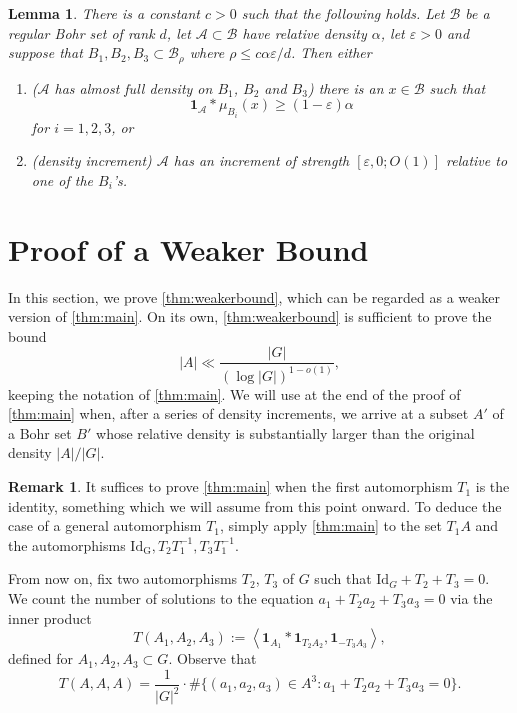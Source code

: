 \documentclass{daj}
\newtheorem{lemma}[theorem]{Lemma}
\theoremstyle{definition}
\newtheorem{remark}[theorem]{Remark}
\newcommand{\eps}{\varepsilon}
\newcommand{\m}[1]{\mu_{#1}}
\newcommand{\ind}[1]{\mathbf{1}_{#1}}
\newcommand{\inner}[2]{\left\langle#1, #2\right\rangle}
\newcommand{\A}{\ensuremath{\mathcal{A}}}
\newcommand{\B}{\ensuremath{\mathcal{B}}}
\begin{document}
\begin{lemma}
\label{lem:bourgain}
There is a constant $c>0$ such that the following holds. Let $\B$ be a regular Bohr set of rank $d$, let $\A\subset \B$ have relative density $\alpha$, let $\eps>0$ and suppose that ${B_1, B_2, B_3} \subset \B_\rho$ where $\rho \leq c\alpha \eps/d$. Then either 
\begin{enumerate}
	\item ($\A$ has almost full density on $B_1$, $B_2$ and $B_3$) there is an $x\in \B$ such that 
	\begin{equation*}
	\ind{\A} * \m{B_i} (x) \geq (1-\eps)\alpha
	\end{equation*}
	for $i=1, 2, 3$, or
	\item (density increment) $\A$ has an increment of strength $[\eps, 0; O(1)]$ relative to one of the $B_i$'s.
\end{enumerate}
\end{lemma}





\section{Proof of a Weaker Bound}
\label{sec:weaker}

In this section, we prove \cref{thm:weakerbound}, which can be regarded as a weaker version of \cref{thm:main}. On its own, \cref{thm:weakerbound} is sufficient to prove the bound 
\begin{equation*}
|A| \ll \frac{|G|}{(\log |G|)^{1-o(1)}},
\end{equation*}
keeping the notation of \cref{thm:main}. We will use  at the end of the proof of \cref{thm:main} when, after a series of density increments, we arrive at a subset $A'$ of a Bohr set $B'$ whose relative density is substantially larger than the original density $|A|/|G|$.

\begin{remark}
\label{rem:identity}
It suffices to prove \cref{thm:main} when the first automorphism $T_1$ is the identity, something which we will assume from this point onward. To deduce the case of a general automorphism $T_1$, simply apply \cref{thm:main} to the set $T_1A$ and the automorphisms $\mathrm{Id_G}, T_2T_1^{-1}, T_3T_1^{-1}$. 
\end{remark}

From now on, fix two automorphisms $T_2$, $T_3$ of $G$ such that $\mathrm{Id}_G + T_2 + T_3 = 0$. We count the number of solutions to the equation $a_1+T_2a_2 + T_3a_3 = 0$ via the inner product
\begin{equation*}
T(A_1, A_2, A_3) := \inner{\ind{A_1} * \ind{T_2A_2}}{\ind{-T_3A_3}},
\end{equation*}
defined for $A_1, A_2, A_3 \subset G$. Observe that
\begin{equation*}
T(A, A, A) = \frac{1}{|G|^2}\cdot \# \{(a_1, a_2, a_3)\in A^3 : a_1+T_2a_2 + T_3a_3 = 0\}.
\end{equation*}
\end{document}
